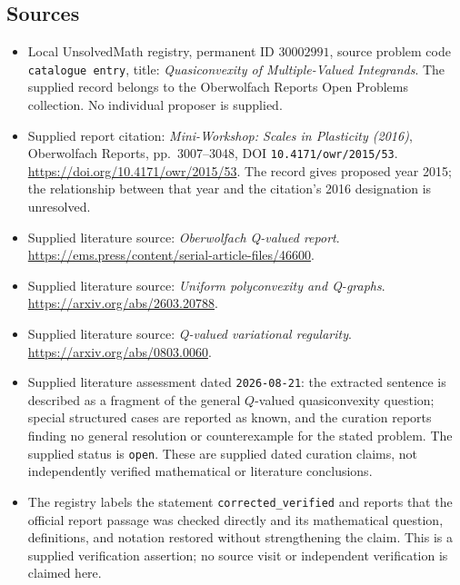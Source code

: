 \documentclass[11pt]{article}
\begin{document}
\subsection{Sources}
\begin{itemize}
\item Local UnsolvedMath registry, permanent ID \(30002991\), source problem code \texttt{catalogue entry}, title: \emph{Quasiconvexity of Multiple-Valued Integrands}. The supplied record belongs to the Oberwolfach Reports Open Problems collection. No individual proposer is supplied.
\item Supplied report citation: \emph{Mini-Workshop: Scales in Plasticity (2016)}, Oberwolfach Reports, pp.\ 3007--3048, DOI \texttt{10.4171/owr/2015/53}. \url{https://doi.org/10.4171/owr/2015/53}. The record gives proposed year 2015; the relationship between that year and the citation's 2016 designation is unresolved.
\item Supplied literature source: \emph{Oberwolfach Q-valued report}. \url{https://ems.press/content/serial-article-files/46600}.
\item Supplied literature source: \emph{Uniform polyconvexity and Q-graphs}. \url{https://arxiv.org/abs/2603.20788}.
\item Supplied literature source: \emph{Q-valued variational regularity}. \url{https://arxiv.org/abs/0803.0060}.
\item Supplied literature assessment dated \texttt{2026-08-21}: the extracted sentence is described as a fragment of the general \(Q\)-valued quasiconvexity question; special structured cases are reported as known, and the curation reports finding no general resolution or counterexample for the stated problem. The supplied status is \texttt{open}. These are supplied dated curation claims, not independently verified mathematical or literature conclusions.
\item The registry labels the statement \texttt{corrected\_verified} and reports that the official report passage was checked directly and its mathematical question, definitions, and notation restored without strengthening the claim. This is a supplied verification assertion; no source visit or independent verification is claimed here.
\end{itemize}
\end{document}

